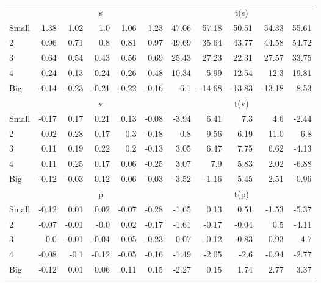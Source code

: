\begin{table}[!ht]
\begin{tabular}{lrrrrrrrrrr}
      & \multicolumn{5}{c}{s} & \multicolumn{5}{c}{t(s)}
    
    \\
      \cmidrule(r){2-6} \cmidrule(r){7-11}

    Small   & 1.38  & 1.02  & 1.0  & 1.06  & 1.23  & 47.06  & 57.18  & 50.51  & 54.33  & 55.61  \\
         2  & 0.96  & 0.71  & 0.8  & 0.81  & 0.97  & 49.69  & 35.64  & 43.77  & 44.58  & 54.72  \\
         3  & 0.64  & 0.54  & 0.43  & 0.56  & 0.69  & 25.43  & 27.23  & 22.31  & 27.57  & 33.75  \\
         4  & 0.24  & 0.13  & 0.24  & 0.26  & 0.48  & 10.34  & 5.99  & 12.54  & 12.3  & 19.81  \\
    Big     & -0.14  & -0.23  & -0.21  & -0.22  & -0.16  & -6.1  & -14.68  & -13.83  & -13.18  & -8.53  \\

  
    
      & \multicolumn{5}{c}{v} & \multicolumn{5}{c}{t(v)}
    
    \\
      \cmidrule(r){2-6} \cmidrule(r){7-11}

    Small   & -0.17  & 0.17  & 0.21  & 0.13  & -0.08  & -3.94  & 6.41  & 7.3  & 4.6  & -2.44  \\
         2  & 0.02  & 0.28  & 0.17  & 0.3  & -0.18  & 0.8  & 9.56  & 6.19  & 11.0  & -6.8  \\
         3  & 0.11  & 0.19  & 0.22  & 0.2  & -0.13  & 3.05  & 6.47  & 7.75  & 6.62  & -4.13  \\
         4  & 0.11  & 0.25  & 0.17  & 0.06  & -0.25  & 3.07  & 7.9  & 5.83  & 2.02  & -6.88  \\
    Big     & -0.12  & -0.03  & 0.12  & 0.06  & -0.03  & -3.52  & -1.16  & 5.45  & 2.51  & -0.96  \\

  
    
      & \multicolumn{5}{c}{p} & \multicolumn{5}{c}{t(p)}
    
    \\
      \cmidrule(r){2-6} \cmidrule(r){7-11}

    Small   & -0.12  & 0.01  & 0.02  & -0.07  & -0.28  & -1.65  & 0.13  & 0.51  & -1.53  & -5.37  \\
         2  & -0.07  & -0.01  & -0.0  & 0.02  & -0.17  & -1.61  & -0.17  & -0.04  & 0.5  & -4.11  \\
         3  & 0.0  & -0.01  & -0.04  & 0.05  & -0.23  & 0.07  & -0.12  & -0.83  & 0.93  & -4.7  \\
         4  & -0.08  & -0.1  & -0.12  & -0.05  & -0.16  & -1.49  & -2.05  & -2.6  & -0.94  & -2.77  \\
    Big     & -0.12  & 0.01  & 0.06  & 0.11  & 0.15  & -2.27  & 0.15  & 1.74  & 2.77  & 3.37  \\


\end{tabular}
\end{table}
